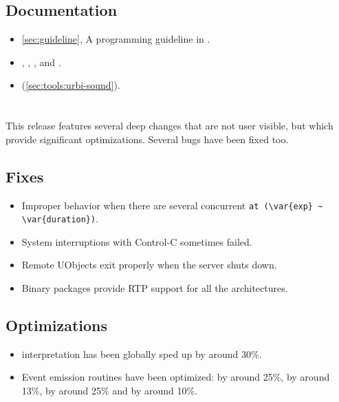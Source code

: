 \subsection{Documentation}
\begin{itemize}
\item \autoref{sec:guideline}, A programming guideline in \usdk.
\item {}, ,
  , and
  .
\item {} (\autoref{sec:tools:urbi-sound}).
\end{itemize}


\section{}

This release features several deep changes that are not user visible, but
which provide significant optimizations.  Several bugs have been fixed too.

\subsection{Fixes}
\begin{itemize}
\item Improper behavior when there are several concurrent
  \lstinline|at (\var{exp} ~ \var{duration})|.
\item System interruptions with Control-C sometimes failed.
\item Remote UObjects exit properly when the server shuts down.
\item Binary packages provide RTP support for all the architectures.
\end{itemize}

\subsection{Optimizations}
\begin{itemize}
\item \us interpretation has been globally sped up by around 30\%.
\item Event emission routines have been optimized:  by
  around 25\%,  by around 13\%,
   by around 25\% and  by
  around 10\%.
\end{itemize}

